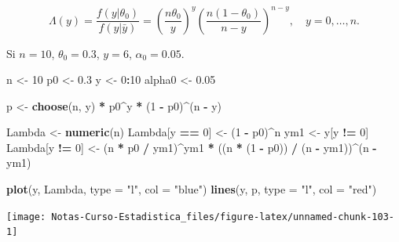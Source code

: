 \documentclass[
  12pt,
]{book}
\newenvironment{Shaded}{\begin{snugshade}}{\end{snugshade}}
\newcommand{\DataTypeTok}[1]{\textcolor[rgb]{0.13,0.29,0.53}{#1}}
\newcommand{\DecValTok}[1]{\textcolor[rgb]{0.00,0.00,0.81}{#1}}
\newcommand{\FloatTok}[1]{\textcolor[rgb]{0.00,0.00,0.81}{#1}}
\newcommand{\KeywordTok}[1]{\textcolor[rgb]{0.13,0.29,0.53}{\textbf{#1}}}
\newcommand{\NormalTok}[1]{#1}
\newcommand{\OperatorTok}[1]{\textcolor[rgb]{0.81,0.36,0.00}{\textbf{#1}}}
\newcommand{\StringTok}[1]{\textcolor[rgb]{0.31,0.60,0.02}{#1}}
\begin{document}
\[\Lambda(y) = \dfrac{f(y|\theta_0)}{f(y|\bar y)} = \left(\dfrac{n\theta_0}{y}\right)^y\left(\dfrac{n(1-\theta_0)}{n-y}\right)^{n-y}, \quad y=0,\dots,n.\]

Si \(n=10\), \(\theta_0 = 0.3\), \(y = 6\), \(\alpha_0=0.05\).

\begin{Shaded}
\begin{Highlighting}[]
\NormalTok{n \textless{}{-}}\StringTok{ }\DecValTok{10}
\NormalTok{p0 \textless{}{-}}\StringTok{ }\FloatTok{0.3}
\NormalTok{y \textless{}{-}}\StringTok{ }\DecValTok{0}\OperatorTok{:}\DecValTok{10}
\NormalTok{alpha0 \textless{}{-}}\StringTok{ }\FloatTok{0.05}

\NormalTok{p \textless{}{-}}\StringTok{ }\KeywordTok{choose}\NormalTok{(n, y) }\OperatorTok{*}\StringTok{ }\NormalTok{p0}\OperatorTok{\^{}}\NormalTok{y }\OperatorTok{*}\StringTok{ }\NormalTok{(}\DecValTok{1} \OperatorTok{{-}}\StringTok{ }\NormalTok{p0)}\OperatorTok{\^{}}\NormalTok{(n }\OperatorTok{{-}}\StringTok{ }\NormalTok{y)}


\NormalTok{Lambda \textless{}{-}}\StringTok{ }\KeywordTok{numeric}\NormalTok{(n)}
\NormalTok{Lambda[y }\OperatorTok{==}\StringTok{ }\DecValTok{0}\NormalTok{] \textless{}{-}}\StringTok{ }\NormalTok{(}\DecValTok{1} \OperatorTok{{-}}\StringTok{ }\NormalTok{p0)}\OperatorTok{\^{}}\NormalTok{n}
\NormalTok{ym1 \textless{}{-}}\StringTok{ }\NormalTok{y[y }\OperatorTok{!=}\StringTok{ }\DecValTok{0}\NormalTok{]}
\NormalTok{Lambda[y }\OperatorTok{!=}\StringTok{ }\DecValTok{0}\NormalTok{] \textless{}{-}}\StringTok{ }\NormalTok{(n }\OperatorTok{*}\StringTok{ }\NormalTok{p0 }\OperatorTok{/}\StringTok{ }\NormalTok{ym1)}\OperatorTok{\^{}}\NormalTok{ym1 }\OperatorTok{*}\StringTok{ }\NormalTok{((n }\OperatorTok{*}\StringTok{ }\NormalTok{(}\DecValTok{1} \OperatorTok{{-}}\StringTok{ }\NormalTok{p0)) }\OperatorTok{/}\StringTok{ }\NormalTok{(n }\OperatorTok{{-}}\StringTok{ }\NormalTok{ym1))}\OperatorTok{\^{}}\NormalTok{(n }\OperatorTok{{-}}\StringTok{ }\NormalTok{ym1)}

\KeywordTok{plot}\NormalTok{(y, Lambda, }\DataTypeTok{type =} \StringTok{"l"}\NormalTok{, }\DataTypeTok{col =} \StringTok{"blue"}\NormalTok{)}
\KeywordTok{lines}\NormalTok{(y, p, }\DataTypeTok{type =} \StringTok{"l"}\NormalTok{, }\DataTypeTok{col =} \StringTok{"red"}\NormalTok{)}
\end{Highlighting}
\end{Shaded}

\begin{center}\texttt{[image: Notas-Curso-Estadistica\_files/figure-latex/unnamed-chunk-103-1]} \end{center}
\end{document}
